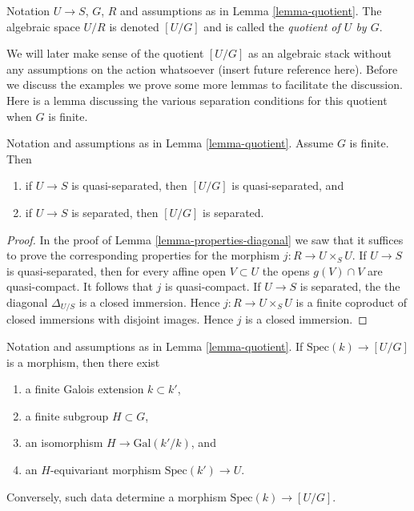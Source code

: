 \begin{definition}
\label{definition-quotient}
Notation $U \to S$, $G$, $R$ and assumptions as in Lemma \ref{lemma-quotient}.
The algebraic space $U/R$ is denoted $[U/G]$ and is
called the {\it quotient of $U$ by $G$}.
\end{definition}

\noindent
We will later make sense of the quotient $[U/G]$ as an
algebraic stack without any assumptions on the action whatsoever
(insert future reference here). Before we discuss the examples we prove
some more lemmas to facilitate the discussion. Here is a lemma discussing the
various separation conditions for this quotient when $G$ is finite.

\begin{lemma}
\label{lemma-quotient-finite-separated}
Notation and assumptions as in Lemma \ref{lemma-quotient}.
Assume $G$ is finite. Then
\begin{enumerate}
\item if $U \to S$ is quasi-separated, then $[U/G]$ is quasi-separated, and
\item if $U \to S$ is separated, then $[U/G]$ is separated.
\end{enumerate}
\end{lemma}

\begin{proof}
In the proof of Lemma \ref{lemma-properties-diagonal}
we saw that it suffices to prove the
corresponding properties for the morphism $j : R \to U \times_S U$.
If $U \to S$ is quasi-separated, then for every affine open $V \subset U$
the opens $g(V) \cap V$ are quasi-compact. It follows that $j$ is
quasi-compact.
If $U \to S$ is separated, the the diagonal $\Delta_{U/S}$ is a closed
immersion. Hence $j : R \to U \times_S U$ is a finite coproduct
of closed immersions with disjoint images. Hence $j$ is a closed immersion.
\end{proof}

\begin{lemma}
\label{lemma-quotient-field-map}
Notation and assumptions as in Lemma \ref{lemma-quotient}.
If $\text{Spec}(k) \to [U/G]$ is a morphism, then there exist
\begin{enumerate}
\item a finite Galois extension $k \subset k'$,
\item a finite subgroup $H \subset G$,
\item an isomorphism $H \to \text{Gal}(k'/k)$, and
\item an $H$-equivariant morphism $\text{Spec}(k') \to U$.
\end{enumerate}
Conversely, such data determine a morphism $\text{Spec}(k) \to [U/G]$.
\end{lemma}

